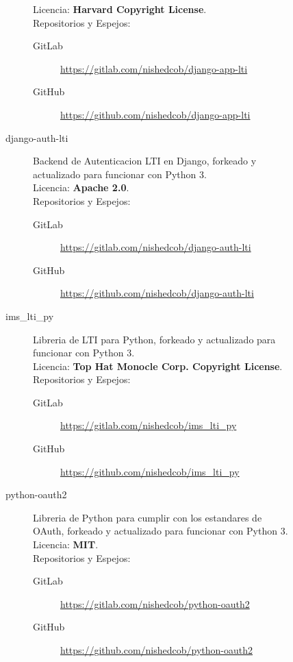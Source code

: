 \begin{description}
\begin{description}
\begin{description}
            Licencia: \textbf{Harvard Copyright License}. \\
            Repositorios y Espejos:
            \begin{description}
                \item[GitLab] \sloppy \url{https://gitlab.com/nishedcob/django-app-lti}
                \item[GitHub] \sloppy \url{https://github.com/nishedcob/django-app-lti}
            \end{description}
            \item[django-auth-lti] Backend de Autenticacion LTI en Django, forkeado y actualizado para funcionar con Python 3.\\
            Licencia: \textbf{Apache 2.0}. \\
            Repositorios y Espejos:
            \begin{description}
                \item[GitLab] \sloppy \url{https://gitlab.com/nishedcob/django-auth-lti}
                \item[GitHub] \sloppy \url{https://github.com/nishedcob/django-auth-lti}
            \end{description}
            \item[ims\_lti\_py] Libreria de LTI para Python, forkeado y actualizado para funcionar con Python 3.\\
            Licencia: \textbf{Top Hat Monocle Corp. Copyright License}. \\
            Repositorios y Espejos:
            \begin{description}
                \item[GitLab] \sloppy \url{https://gitlab.com/nishedcob/ims_lti_py}
                \item[GitHub] \sloppy \url{https://github.com/nishedcob/ims_lti_py}
            \end{description}
            \item[python-oauth2] Libreria de Python para cumplir con los estandares de OAuth, forkeado y actualizado para funcionar con Python 3.
            \\
            Licencia: \textbf{MIT}. \\
            Repositorios y Espejos:
            \begin{description}
                \item[GitLab] \sloppy \url{https://gitlab.com/nishedcob/python-oauth2}
                \item[GitHub] \sloppy \url{https://github.com/nishedcob/python-oauth2}

\end{description}
\end{description}
\end{description}
\end{description}
